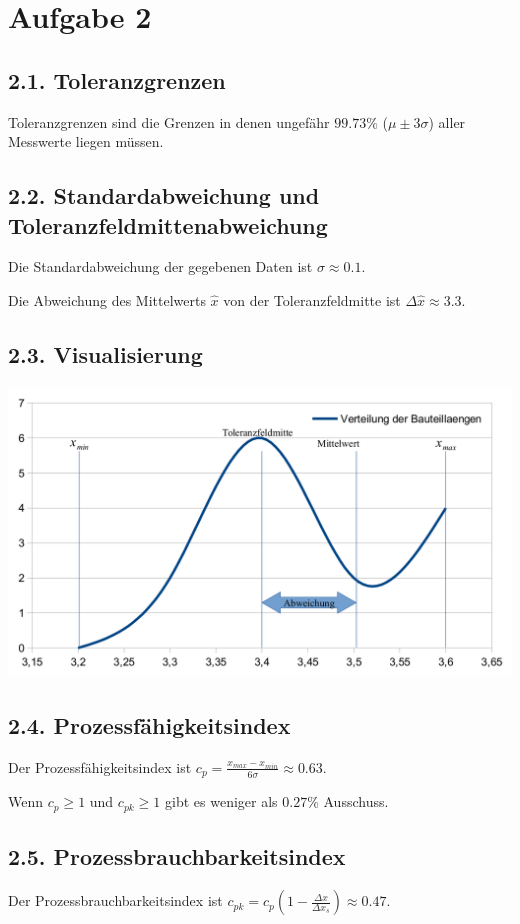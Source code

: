 \documentclass[12pt,a4paper]{article}
\begin{document}
\pagebreak
\section*{Aufgabe 2}
\subsection*{2.1. Toleranzgrenzen}
Toleranzgrenzen sind die Grenzen in denen ungefähr $99.73\%$ ($\mu \pm 3\sigma$) aller Messwerte liegen müssen.

\subsection*{2.2. Standardabweichung und Toleranzfeldmittenabweichung}
Die Standardabweichung der gegebenen Daten ist $\sigma \approx 0.1$.

Die Abweichung des Mittelwerts $\hat{x}$ von der Toleranzfeldmitte ist $\Delta \hat{x} \approx 3.3$.

\subsection*{2.3. Visualisierung}

\includegraphics[scale=0.40]{2_3_diag}

\subsection*{2.4. Prozessfähigkeitsindex}

Der Prozessfähigkeitsindex ist $c_p = \frac{x_{max} - x_{min}}{6\sigma} \approx 0.63$.

Wenn $c_p \geq 1$ und $c_{pk} \geq 1$ gibt es weniger als $0.27\%$ Ausschuss.

\subsection*{2.5. Prozessbrauchbarkeitsindex}
Der Prozessbrauchbarkeitsindex ist $c_{pk} = c_p \left(1-\frac{\Delta \hat{x}}{\Delta x_s}\right) \approx 0.47$.
\end{document}
